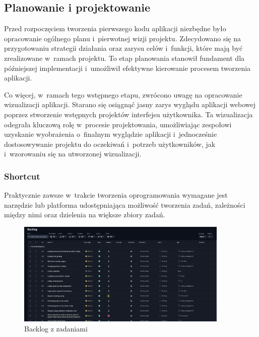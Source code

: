 \subsection{Planowanie i projektowanie}

Przed rozpoczęciem tworzenia pierwszego kodu aplikacji niezbędne było
opracowanie ogólnego planu i~pierwotnej wizji projektu. Zdecydowano
się na przygotowaniu strategii działania oraz
zarysu celów i~funkcji, które mają być zrealizowane w~ramach projektu.
To etap planowania stanowił fundament dla późniejszej implementacji
i~umożliwił efektywne kierowanie procesem tworzenia aplikacji.

Co więcej, w~ramach tego wstępnego etapu, zwrócono uwagę na
opracowanie wizualizacji aplikacji. Starano się osiągnąć jasny
zarys wyglądu aplikacji webowej poprzez stworzenie wstępnych projektów
interfejsu użytkownika. Ta wizualizacja odegrała kluczową rolę
w~procesie projektowania, umożliwiając zespołowi uzyskanie wyobrażenia
o~finalnym wyglądzie aplikacji i~jednocześnie dostosowywanie projektu
do oczekiwań i~potrzeb użytkowników, jak i~wzorowaniu się na utworzonej
wizualizacji.


\subsubsection{Shortcut}

Praktycznie zawsze w~trakcie tworzenia oprogramowania wymagane jest
narzędzie lub platforma udostępniająca możliwość tworzenia zadań,
zależności między nimi oraz dzielenia na większe zbiory zadań.

\begin{figure}[h!]
  \centering
  \includegraphics[width=0.9\textwidth]{img/shortcut/shortcut_backlog.png}
  \caption{Backlog z zadaniami}
\end{figure}

